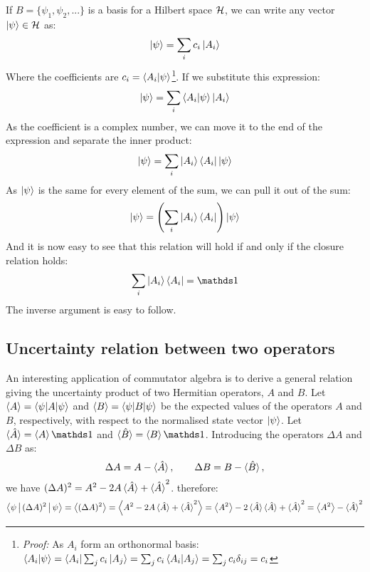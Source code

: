 If $B = \{\psi_1, \psi_2, ...\}$ is a basis for a Hilbert space $\mathcal{H}$, we can write any vector $\ket{\psi}\in\mathcal{H}$ as:
\begin{equation}
    \ket{\psi} = \sum_i c_i\ket{A_i}
\end{equation}
Where the coefficients are $c_i = \braket{A_i|\psi}$\footnote{\textit{Proof:} As $A_i$ form an orthonormal basis: $\braket{A_i|\psi} = \bra{A_i}\sum_jc_i\ket{A_j} = \sum_jc_i\braket{A_i|A_j} = \sum_jc_i\delta_{ij} = c_i$}. If we substitute this expression:
\begin{equation}
    \ket{\psi} = \sum_i \braket{A_i|\psi}\ket{A_i}
\end{equation}
As the coefficient is a complex number, we can move it to the end of the expression and separate the inner product:
\begin{equation}
    \ket{\psi} = \sum_i \ket{A_i}\bra{A_i}\ket{\psi}
\end{equation}
As $\ket{\psi}$ is the same for every element of the sum, we can pull it out of the sum:
\begin{equation}
    \ket{\psi} = \left(\sum_i \ket{A_i}\bra{A_i}\right)\ket{\psi}
\end{equation}
And it is now easy to see that this relation will hold if and only if the closure relation holds:
\begin{equation}
    \sum_i \ket{A_i}\bra{A_i} = \Imat
\end{equation}
The inverse argument is easy to follow.

\subsection{Uncertainty relation between two operators} \label{uncertainty_relation}

An interesting application of commutator algebra is to derive a general relation giving the uncertainty product of two Hermitian operators, $A$ and $B$. Let $\braket{A} = \braket{\psi|A|\psi}$ and $\braket{B}=\braket{\psi|B|\psi}$ be the expected values of the operators $A$ and $B$, respectively, with respect to the normalised state vector $\ket{\psi}$. Let $\braket{\hat A} = \braket{A}\Imat$ and $\braket{\hat B} = \braket{B}\Imat$. Introducing the operators $\Delta A$ and $\Delta B$ as:
\begin{equation} \label{eqn:uncertainty_def}
    \Delta A = A - \braket{\hat A}, \qquad \Delta B = B - \braket{\hat B},
\end{equation}
we have $(\Delta A)^2 = A^2 - 2A\braket{\hat A} + \braket{\hat A}^2$. therefore:
\begin{equation}
    \Braket{\psi|(\Delta A)^2|\psi} = \left\langle(\Delta A)^2\right\rangle = \left\langle A^2 - 2A\braket{\hat A} + \braket{\hat A}^2\right\rangle = \left\langle A^2\right\rangle - 2\braket{\hat A}\braket{\hat A} + \braket{\hat A}^2 = \left\langle A^2\right\rangle - \braket{\hat A}^2
\end{equation}

